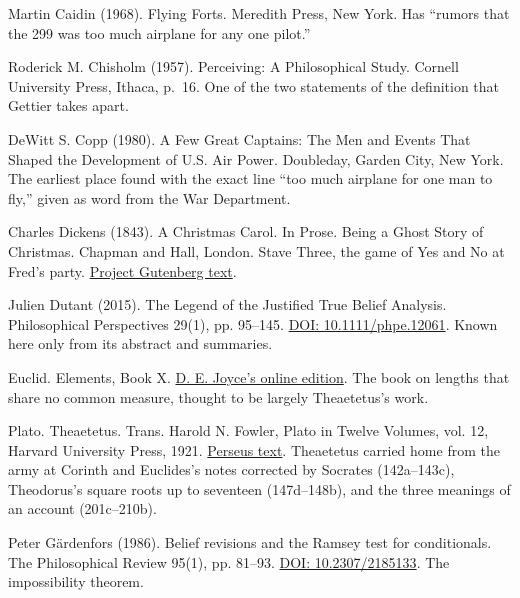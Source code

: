 \noindent Martin Caidin (1968). Flying Forts. Meredith Press, New York. Has ``rumors that the 299 was too much airplane for any one pilot.''
\par\medskip

\noindent Roderick M. Chisholm (1957). Perceiving: A Philosophical Study. Cornell University Press, Ithaca, p.~16. One of the two statements of the definition that Gettier takes apart.
\par\medskip

\noindent DeWitt S. Copp (1980). A Few Great Captains: The Men and Events That Shaped the Development of U.S. Air Power. Doubleday, Garden City, New York. The earliest place found with the exact line ``too much airplane for one man to fly,'' given as word from the War Department.
\par\medskip

\noindent Charles Dickens (1843). A Christmas Carol. In Prose. Being a Ghost Story of Christmas. Chapman and Hall, London. Stave Three, the game of Yes and No at Fred's party. \href{https://www.gutenberg.org/ebooks/46}{Project Gutenberg text}.
\par\medskip

\noindent Julien Dutant (2015). The Legend of the Justified True Belief Analysis. Philosophical Perspectives 29(1), pp. 95--145. \href{https://doi.org/10.1111/phpe.12061}{DOI: 10.1111/phpe.12061}. Known here only from its abstract and summaries.
\par\medskip

\noindent Euclid. Elements, Book X. \href{https://mathcs.clarku.edu/~djoyce/elements/bookX/bookX.html}{D. E. Joyce's online edition}. The book on lengths that share no common measure, thought to be largely Theaetetus's work.
\par\medskip

\noindent Plato. Theaetetus. Trans. Harold N. Fowler, Plato in Twelve Volumes, vol. 12, Harvard University Press, 1921. \href{http://www.perseus.tufts.edu/hopper/text?doc=Perseus:text:1999.01.0172}{Perseus text}. Theaetetus carried home from the army at Corinth and Euclides's notes corrected by Socrates (142a--143c), Theodorus's square roots up to seventeen (147d--148b), and the three meanings of an account (201c--210b).
\par\medskip

\noindent Peter G\"ardenfors (1986). Belief revisions and the Ramsey test for conditionals. The Philosophical Review 95(1), pp. 81--93. \href{https://doi.org/10.2307/2185133}{DOI: 10.2307/2185133}. The impossibility theorem.
\par\medskip

